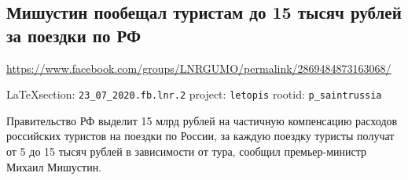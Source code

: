  
 

\subsection{Мишустин пообещал туристам до 15 тысяч рублей за поездки по РФ}
\url{https://www.facebook.com/groups/LNRGUMO/permalink/2869484873163068/}
  
\vspace{0.5cm}
{\small\LaTeX section: \verb|23_07_2020.fb.lnr.2| project: \verb|letopis| rootid: \verb|p_saintrussia|}
\vspace{0.5cm}

Правительство РФ выделит 15 млрд рублей на частичную компенсацию расходов
российских туристов на поездки по России, за каждую поездку туристы получат от
5 до 15 тысяч рублей в зависимости от тура, сообщил премьер-министр Михаил
Мишустин.
